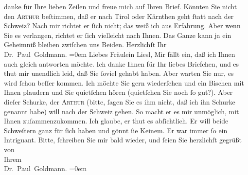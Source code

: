 \begin{ledgroupsized}[t]{13cm}
               danke für Ihre lieben Zeilen und freue mich auf Ihren Brief. Könnten Sie nicht den
                  \textsc{Arthur} beſtimmen, daß er nach Tirol oder Kärnthen geht
               ſtatt nach der Schweiz? Nach mir richtet er
               ſich nicht; das weiß ich aus Erfahrung. Aber wenn Sie es verlangen, richtet er ſich
               vielleicht nach Ihnen. Das Ganze kann ja ein Geheimniß bleiben zwiſchen uns  Beiden.\pend
           \pstart
           Herzlichſt Ihr {\\[\baselineskip]}\spacefill\mbox{Dr. Paul Goldmann.}\pend
           \leftskip=0em{}{\bigskip}\pstart
           \noindent{}{\pb}Liebes Fräulein Liesl,\pend
           \pstart
           Mir fällt ein, daß ich Ihnen auch gleich antworten möchte. Ich danke Ihnen für Ihr
               liebes Briefchen, und es thut mir unendlich leid, daß Sie ſoviel \label{K_L03071-3v}\label{K_L03071-3h} gehabt
               haben. Aber warten Sie nur, es wird ſchon beſſer kommen. Ich möchte Sie gern
               wiederſehen und ein Bischen mit Ihnen plaudern und Sie quietſchen hören (quietſchen
               Sie noch ſo gut?). Aber dieſer {\pb}Schurke, der \textsc{Arthur} (bitte,  ſagen Sie es ihm \strikeout{\textcolor{gray}{×}\-\textcolor{gray}{×}\-\textcolor{gray}{×}} nicht, daß ich ihn Schurke genannt habe) will nach der Schweiz gehen. So macht er es mir unmöglich, mit Ihnen
               zuſammenzukommen. Ich glaube, er thut es abſichtlich. Er will beide Schweſtern ganz
               für ſich haben und gönnt ſie Keinem. Er war immer ſo ein Intriguant.\pend
           \pstart
           {\pb}Bitte, ſchreiben Sie mir bald wieder, und ſeien Sie
               herzlichſt gegrüßt von {\\[\baselineskip]}Ihrem {\\[\baselineskip]}\spacefill\mbox{Dr. Paul Goldmann.}\pend
           \leftskip=0em{}
         
         \endnumbering{}\end{ledgroupsized}  \newcommand{\dateiname}{L03071}\newcommand{\titel}{Paul Goldmann an Arthur Schnitzler, Olga und Elisabeth Gussmann, 3. 7. [1901]}\newcommand{\editorInnen}{Martin Anton Müller und Laura Untner}
      